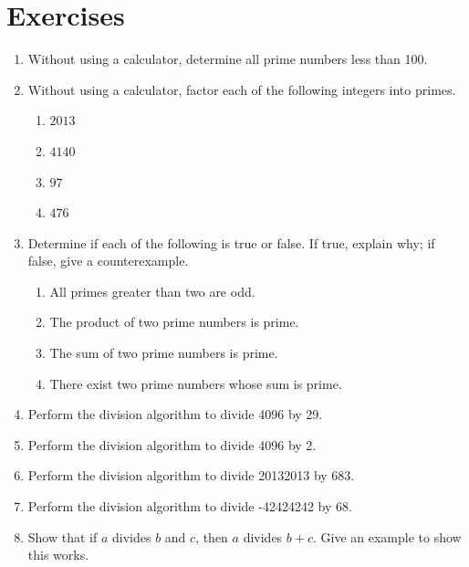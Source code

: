 \documentclass{book}
\theoremstyle{plain}
\theoremstyle{definition}
\newif\ifprintsolutions
\newcommand{\solution}[1]{\ifprintsolutions \begin{sloppypar}{\it #1}\end{sloppypar} \fi} %
\begin{document}
\section{Exercises}
\begin{enumerate}
\item Without using a calculator, determine all prime numbers less than 100. \solution{Use the sieve method. There are $25$ such primes.}
\item Without using a calculator, factor each of the following integers into primes.
\begin{enumerate}
\item $2013$ \solution{$2013 = 3 \times 11 \times 61$}
\item $4140$ \solution{$4140 = 2^2 \times 3^2 \times 5 \times 23$}
\item $97$ \solution{$97$ is prime}
\item $476$ \solution{$476 = 2^2 \times 7 \times 17$}
\end{enumerate}
\item Determine if each of the following is true or false. If true, explain why; if false, give a counterexample.
\begin{enumerate}
\item All primes greater than two are odd. \solution{True; any even number is divisible by two.}
\item The product of two prime numbers is prime. \solution{False; this is by definition.}
\item The sum of two prime numbers is prime. \solution{False; a counterexample is $3+3=6$.}
\item There exist two prime numbers whose sum is prime. \solution{True; an example is $2+3=5$.}
\end{enumerate}
\item Perform the division algorithm to divide 4096 by 29. \solution{$4096 = 141 \times 29 + 7$}
\item Perform the division algorithm to divide 4096 by 2. \solution{$4096 = 2048 \times 2 + 0$}
\item Perform the division algorithm to divide 20132013 by 683. \solution{$20132013 = 29475 \times 683 + 588$}
\item Perform the division algorithm to divide -42424242 by 68. \solution{$-42424242 = -623885 \times 68 + 62$}
\item Show that if $a$ divides $b$ and $c$, then $a$ divides $b+c$. Give an example to show this works. \solution{We have $b = ma$ and $c = na$ for some $m$ and $n$. Then $b+c = ma+na = (m+n)a$.}

\end{enumerate}
\end{document}
